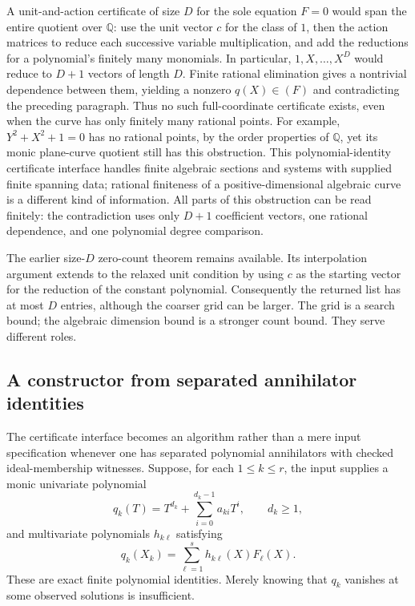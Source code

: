 A unit-and-action certificate of size $D$ for the sole equation
$F=0$ would span the entire quotient over $\mathbb Q$: use the
unit vector $c$ for the class of $1$, then the action matrices
to reduce each successive variable multiplication, and add the
reductions for a polynomial's finitely many monomials.  In particular,
$1,X,\ldots,X^D$ would reduce to $D+1$ vectors of length $D$.
Finite rational elimination gives a nontrivial dependence between
them, yielding a nonzero $q(X)\in(F)$ and contradicting the preceding
paragraph.  Thus no such full-coordinate certificate exists, even
when the curve has only finitely many rational points.  For example,
$Y^2+X^2+1=0$ has no rational points, by the order properties of
$\mathbb Q$, yet its monic plane-curve quotient still has this
obstruction.  This polynomial-identity certificate interface handles
finite algebraic sections and systems with supplied finite spanning
data; rational finiteness
of a positive-dimensional algebraic curve is a different kind of
information.  All parts of this obstruction can be read finitely:
the contradiction uses only $D+1$ coefficient vectors, one rational
dependence, and one polynomial degree comparison.

The earlier size-$D$ zero-count theorem remains available.  Its
interpolation argument extends to the relaxed unit condition by using
$c$ as the starting vector for the reduction of the constant polynomial.
Consequently the returned list has at most $D$ entries, although the
coarser grid can be larger.  The grid is a search bound; the algebraic
dimension bound is a stronger count bound.  They serve different roles.

\subsection{A constructor from separated annihilator identities}
\label{sec:separated-annihilators}

The certificate interface becomes an algorithm rather than a mere input
specification whenever one has separated polynomial annihilators with
checked ideal-membership witnesses.  Suppose, for each $1\le k\le r$,
the input supplies a monic univariate polynomial
\[
 q_k(T)=T^{d_k}+\sum_{i=0}^{d_k-1}a_{ki}T^i,
 \qquad d_k\ge1,
\]
and multivariate polynomials $h_{k\ell}$ satisfying
\[
 q_k(X_k)=\sum_{\ell=1}^s h_{k\ell}(X)F_\ell(X).
 \label{eq:separated-annihilator}
\]
These are exact finite polynomial identities.  Merely knowing that
$q_k$ vanishes at some observed solutions is insufficient.

